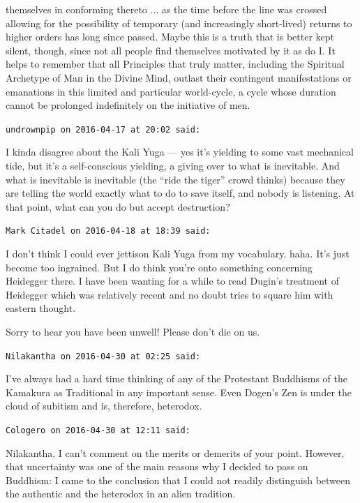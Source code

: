 \begin{footnotesize}
\begin{sffamily}
themselves in conforming thereto ... as the time before the line was crossed allowing for the possibility of temporary (and increasingly short-lived) returns to higher orders has long since passed. Maybe this is a truth that is better kept silent, though, since not all people find themselves motivated by it as do I. It helps to remember that all Principles that truly matter, including the Spiritual Archetype of Man in the Divine Mind, outlast their contingent manifestations or emanations in this limited and particular world-cycle, a cycle whose duration cannot be prolonged indefinitely on the initiative of men.

\hfill

\texttt{undrownpip on 2016-04-17 at 20:02 said:}

I kinda disagree about the Kali Yuga --- yes it's yielding to some vast mechanical tide, but it's a self-conscious yielding, a giving over to what is inevitable. And what is inevitable is inevitable (the ``ride the tiger'' crowd thinks) because they are telling the world exactly what to do to save itself, and nobody is listening. At that point, what can you do but accept destruction?

\hfill

\texttt{Mark Citadel on 2016-04-18 at 18:39 said:}

I don't think I could ever jettison Kali Yuga from my vocabulary. haha. It's just become too ingrained. But I do think you're onto something concerning Heidegger there. I have been wanting for a while to read Dugin's treatment of Heidegger which was relatively recent and no doubt tries to square him with eastern thought.

Sorry to hear you have been unwell! Please don't die on us.

\hfill

\texttt{Nilakantha on 2016-04-30 at 02:25 said:}

I've always had a hard time thinking of any of the Protestant Buddhisms of the Kamakura as Traditional in any important sense. Even Dogen's Zen is under the cloud of subitism and is, therefore, heterodox.

\hfill

\texttt{Cologero on 2016-04-30 at 12:11 said:}

Nilakantha, I can't comment on the merits or demerits of your point. However, that uncertainty was one of the main reasons why I decided to pass on Buddhism: I came to the conclusion that I could not readily distinguish between the authentic and the heterodox in an alien tradition.


\end{sffamily}
\end{footnotesize}
